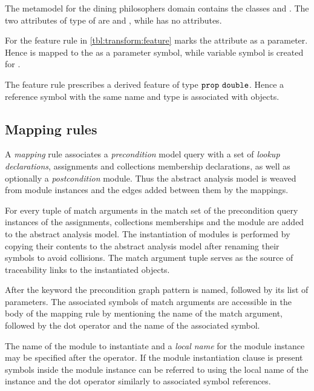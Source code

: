 \begin{runningExample}
  The metamodel for the dining philosophers domain contains the classes  and . The two attributes of type  of  are  and , while  has no attributes.

  For  the feature rule in \vref{tbl:transform:feature} marks the attribute  as a parameter. Hence  is mapped to the  as a parameter symbol, while  variable symbol is created for .

  The  feature rule prescribes a derived feature  of type \(\texttt{\upshape prop}\ \texttt{\upshape double}\). Hence a reference symbol with the same name and type is associated with  objects.
\end{runningExample}

\subsection{Mapping rules}

A \emph{mapping} rule associates a \emph{precondition} model query with a set of \emph{lookup declarations}, assignments and collections membership declarations, as well as optionally a \emph{postcondition}  module. Thus the abstract analysis model is weaved from  module instances and the edges added between them by the mappings.

For every tuple of match arguments in the match set of the precondition query instances of the assignments, collections memberships and the  module are added to the abstract analysis model. The instantiation of modules is performed by copying their contents to the abstract analysis model after renaming their symbols to avoid collisions. The match argument tuple serves as the source of traceability links to the instantiated objects.

After the keyword  the precondition graph pattern is named, followed by its list of parameters. The associated symbols of match arguments are accessible in the body of the mapping rule by mentioning the name of the match argument, followed by the dot operator and the name of the associated symbol.

The name of the  module to instantiate and a \emph{local name} for the module instance may be specified after the \lit{=>} operator. If the module instantiation clause is present symbols inside the module instance can be referred to using the local name of the instance and the dot operator similarly to associated symbol references.

